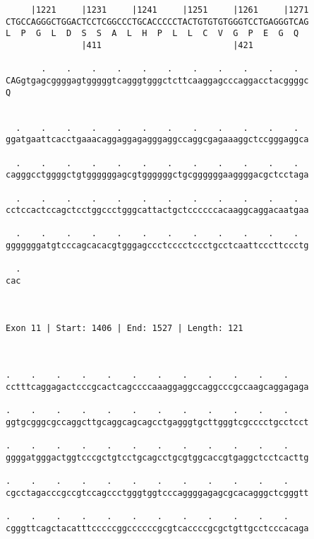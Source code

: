 \documentclass{article}
\begin{document}
\begin{Verbatim}
     |1221     |1231     |1241     |1251     |1261     |1271
CTGCCAGGGCTGGACTCCTCGGCCCTGCACCCCCTACTGTGTGTGGGTCCTGAGGGTCAG
L  P  G  L  D  S  S  A  L  H  P  L  L  C  V  G  P  E  G  Q  
               |411                          |421           
  
       .    .    .    .    .    .    .    .    .    .    .  
CAGgtgagcggggagtgggggtcagggtgggctcttcaaggagcccaggacctacggggc
Q                                                           
                                                            
  
  .    .    .    .    .    .    .    .    .    .    .    .  
ggatgaattcacctgaaacaggaggagagggaggccaggcgagaaaggctccgggaggca
                                                            
  .    .    .    .    .    .    .    .    .    .    .    .  
cagggcctggggctgtggggggagcgtggggggctgcggggggaaggggacgctcctaga
                                                            
  .    .    .    .    .    .    .    .    .    .    .    .  
cctccactccagctcctggccctgggcattactgctccccccacaaggcaggacaatgaa
                                                            
  .    .    .    .    .    .    .    .    .    .    .    .  
gggggggatgtcccagcacacgtgggagccctcccctccctgcctcaattcccttccctg
                                                            
  .
cac
   
   
 
Exon 11 | Start: 1406 | End: 1527 | Length: 121



.    .    .    .    .    .    .    .    .    .    .    .    
cctttcaggagactcccgcactcagccccaaaggaggccaggcccgccaagcaggagaga
                                                            
.    .    .    .    .    .    .    .    .    .    .    .    
ggtgcgggcgccaggcttgcaggcagcagcctgagggtgcttgggtcgcccctgcctcct
                                                            
.    .    .    .    .    .    .    .    .    .    .    .    
ggggatgggactggtcccgctgtcctgcagcctgcgtggcaccgtgaggctcctcacttg
                                                            
.    .    .    .    .    .    .    .    .    .    .    .    
cgcctagacccgccgtccagccctgggtggtcccaggggagagcgcacagggctcgggtt
                                                            
.    .    .    .    .    .    .    .    .    .    .    .    
cgggttcagctacatttcccccggccccccgcgtcaccccgcgctgttgcctcccacaga
                                                            

\end{Verbatim}
\end{document}
